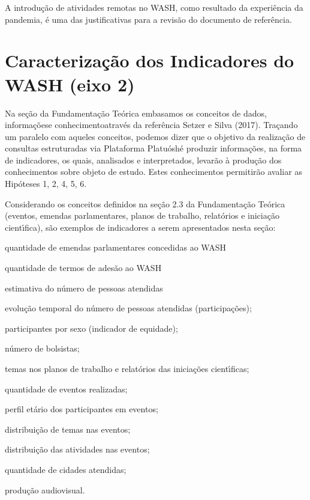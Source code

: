 \documentclass[
12pt,		%
openright,	%
twoside,  %
a4paper,			%
chapter=TITLE,		%
english,			%
french,				%
spanish,			%
brazil				%
]{USPSC-classe/USPSC}
\begin{document}
A introdu\c{c}\~ao de atividades remotas no WASH, como resultado da experi\^encia da pandemia, \'e uma das justificativas para a revis\~ao do documento de refer\^encia.








\section[Caracteriza\c{c}\~ao dos Indicadores do WASH (eixo 2)]{Caracteriza\c{c}\~ao dos Indicadores do WASH (eixo 2)}\label{Caracteriza\c{c}\~ao dos Indicadores do WASH (eixo 2)}
Na se\c{c}\~ao da Fundamenta\c{c}\~ao Te\'orica embasamos os conceitos de \textquotedbl dados\textquotedbl , \textquotedbl informa\c{c}\~oes\textquotedbl  e \textquotedbl conhecimento\textquotedbl   atrav\'es da refer\^encia  Setzer e Silva (2017). Tra\c{c}ando um paralelo com aqueles conceitos, podemos dizer que o objetivo da realiza\c{c}\~ao de consultas estruturadas via Plataforma \textquotedbl Platu\'osh\textquotedbl  \'e produzir informa\c{c}\~oes, na forma de indicadores, os quais, analisados e interpretados, levar\~ao \`a produ\c{c}\~ao dos conhecimentos sobre objeto de estudo. Estes conhecimentos permitir\~ao avaliar as Hip\'oteses 1, 2, 4, 5, 6.








Considerando os conceitos definidos na se\c{c}\~ao 2.3 da Fundamenta\c{c}\~ao Te\'orica (eventos, emendas parlamentares, planos de trabalho, relat\'orios e inicia\c{c}\~ao cient\'{\i}fica), s\~ao exemplos de indicadores a serem apresentados nesta se\c{c}\~ao:









\begin{alineas}
\item quantidade de emendas parlamentares concedidas ao WASH
\item quantidade de termos de ades\~ao ao WASH
\item estimativa do n\'umero de pessoas atendidas
\item evolu\c{c}\~ao temporal do n\'umero de pessoas atendidas (participa\c{c}\~oes);
\item participantes por sexo (indicador de equidade);
\item n\'umero de bolsistas;
\item temas nos planos de trabalho e relat\'orios das inicia\c{c}\~oes cient\'{\i}ficas;
\item quantidade de eventos realizadas;
\item perfil et\'ario dos participantes em eventos;
\item distribui\c{c}\~ao de temas nas eventos;
\item distribui\c{c}\~ao das atividades nas eventos;
\item quantidade de cidades atendidas;
\item produ\c{c}\~ao audiovisual.
\end{alineas}
\end{document}
